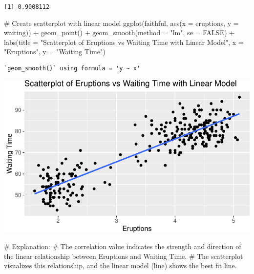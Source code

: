 \documentclass[
  letterpaper,
  DIV=11,
  numbers=noendperiod]{scrreprt}
\newenvironment{Shaded}{\begin{snugshade}}{\end{snugshade}}
\newcommand{\AttributeTok}[1]{\textcolor[rgb]{0.40,0.45,0.13}{#1}}
\newcommand{\CommentTok}[1]{\textcolor[rgb]{0.37,0.37,0.37}{#1}}
\newcommand{\ConstantTok}[1]{\textcolor[rgb]{0.56,0.35,0.01}{#1}}
\newcommand{\FunctionTok}[1]{\textcolor[rgb]{0.28,0.35,0.67}{#1}}
\newcommand{\NormalTok}[1]{\textcolor[rgb]{0.00,0.23,0.31}{#1}}
\newcommand{\SpecialCharTok}[1]{\textcolor[rgb]{0.37,0.37,0.37}{#1}}
\newcommand{\StringTok}[1]{\textcolor[rgb]{0.13,0.47,0.30}{#1}}
\begin{document}
\begin{verbatim}
[1] 0.9008112
\end{verbatim}

\begin{Shaded}
\begin{Highlighting}[]
\CommentTok{\# Create scatterplot with linear model}
\FunctionTok{ggplot}\NormalTok{(faithful, }\FunctionTok{aes}\NormalTok{(}\AttributeTok{x =}\NormalTok{ eruptions, }\AttributeTok{y =}\NormalTok{ waiting)) }\SpecialCharTok{+}
  \FunctionTok{geom\_point}\NormalTok{() }\SpecialCharTok{+}
  \FunctionTok{geom\_smooth}\NormalTok{(}\AttributeTok{method =} \StringTok{"lm"}\NormalTok{, }\AttributeTok{se =} \ConstantTok{FALSE}\NormalTok{) }\SpecialCharTok{+}
  \FunctionTok{labs}\NormalTok{(}\AttributeTok{title =} \StringTok{"Scatterplot of Eruptions vs Waiting Time with Linear Model"}\NormalTok{, }\AttributeTok{x =} \StringTok{"Eruptions"}\NormalTok{, }\AttributeTok{y =} \StringTok{"Waiting Time"}\NormalTok{)}
\end{Highlighting}
\end{Shaded}

\begin{verbatim}
`geom_smooth()` using formula = 'y ~ x'
\end{verbatim}

\includegraphics{Linear_Modeling_and_Regression_files/figure-pdf/unnamed-chunk-20-1.pdf}

\begin{Shaded}
\begin{Highlighting}[]
\CommentTok{\# Explanation:}
\CommentTok{\# The correlation value indicates the strength and direction of the linear relationship between Eruptions and Waiting Time.}
\CommentTok{\# The scatterplot visualizes this relationship, and the linear model (line) shows the best fit line.}
\end{Highlighting}
\end{Shaded}
\end{document}
